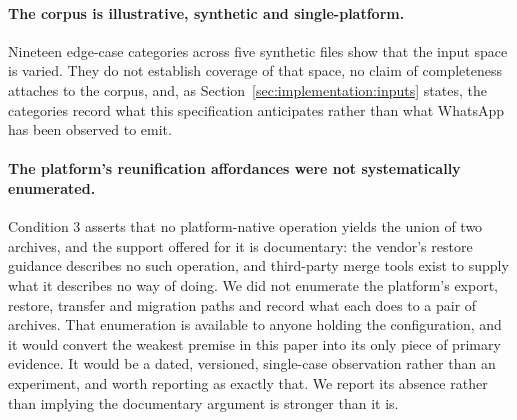 \paragraph{The corpus is illustrative, synthetic and single-platform.}
Nineteen edge-case categories across five synthetic files show that the input
space is varied. They do not establish coverage of that space, no claim of
completeness attaches to the corpus, and, as
Section~\ref{sec:implementation:inputs} states, the categories record what this
specification anticipates rather than what WhatsApp has been observed to emit.

\paragraph{The platform's reunification affordances were not systematically
enumerated.}
Condition 3 asserts that no platform-native operation yields the union of two
archives, and the support offered for it is documentary: the vendor's restore
guidance describes no such operation, and third-party merge tools exist to supply
what it describes no way of doing. We did not enumerate the platform's export,
restore, transfer and migration paths and record what each does to a pair of
archives. That enumeration is available to anyone holding the configuration, and
it would convert the weakest premise in this paper into its only piece of primary
evidence. It would be a dated, versioned, single-case observation rather than an
experiment, and worth reporting as exactly that. We report its absence rather than implying the documentary
argument is stronger than it is.
